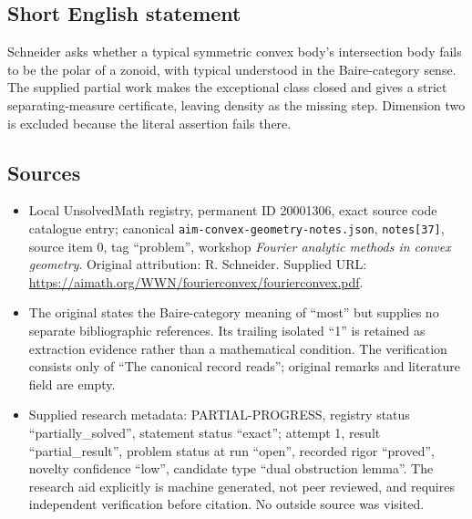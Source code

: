 \documentclass[11pt]{article}
\begin{document}
\subsection{Short English statement}
Schneider asks whether a typical symmetric convex body's intersection body fails to be the polar of a zonoid, with typical understood in the Baire-category sense. The supplied partial work makes the exceptional class closed and gives a strict separating-measure certificate, leaving density as the missing step. Dimension two is excluded because the literal assertion fails there.
\subsection{Sources}
\begin{itemize}
\item Local UnsolvedMath registry, permanent ID 20001306, exact source code catalogue entry; canonical \texttt{aim-convex-geometry-notes.json}, \texttt{notes[37]}, source item 0, tag ``problem'', workshop \emph{Fourier analytic methods in convex geometry}. Original attribution: R. Schneider. Supplied URL: \url{https://aimath.org/WWN/fourierconvex/fourierconvex.pdf}.
\item The original states the Baire-category meaning of ``most'' but supplies no separate bibliographic references. Its trailing isolated ``1'' is retained as extraction evidence rather than a mathematical condition. The verification consists only of ``The canonical record reads''; original remarks and literature field are empty.
\item Supplied research metadata: PARTIAL-PROGRESS, registry status ``partially\_solved'', statement status ``exact''; attempt 1, result ``partial\_result'', problem status at run ``open'', recorded rigor ``proved'', novelty confidence ``low'', candidate type ``dual obstruction lemma''. The research aid explicitly is machine generated, not peer reviewed, and requires independent verification before citation. No outside source was visited.
\end{itemize}
\end{document}
